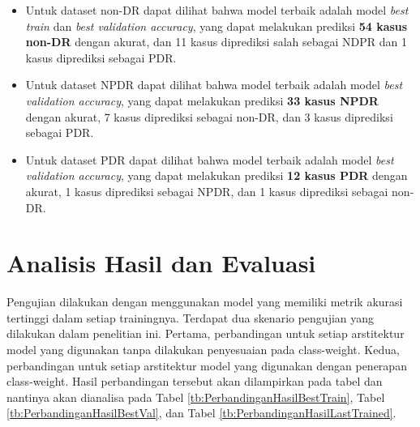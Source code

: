 \begin{itemize}
	\item Untuk dataset non-DR dapat dilihat bahwa model terbaik adalah model \emph{best train} dan \emph{best validation accuracy}, yang dapat melakukan prediksi \textbf{54 kasus non-DR} dengan akurat, dan 11 kasus diprediksi salah sebagai NDPR dan 1 kasus diprediksi sebagai PDR.
	
	\item Untuk dataset NPDR dapat dilihat bahwa model terbaik adalah model \emph{best validation accuracy}, yang dapat melakukan prediksi \textbf{33 kasus NPDR} dengan akurat, 7 kasus diprediksi sebagai non-DR, dan 3 kasus diprediksi sebagai PDR.
	
	\item Untuk dataset PDR dapat dilihat bahwa model terbaik adalah model \emph{best validation accuracy}, yang dapat melakukan prediksi \textbf{12 kasus PDR} dengan akurat, 1 kasus diprediksi sebagai NPDR, dan 1 kasus diprediksi sebagai non-DR.
\end{itemize}

\section{Analisis Hasil dan Evaluasi}
\label{sec:42}

Pengujian dilakukan dengan menggunakan model yang memiliki metrik akurasi tertinggi dalam setiap trainingnya. Terdapat dua skenario pengujian yang dilakukan dalam penelitian ini. Pertama, perbandingan untuk setiap arstitektur model yang digunakan tanpa dilakukan penyesuaian pada class-weight. Kedua, perbandingan untuk setiap arstitektur model yang digunakan dengan penerapan class-weight. Hasil perbandingan tersebut akan dilampirkan pada tabel dan nantinya akan dianalisa pada Tabel \ref{tb:PerbandinganHasilBestTrain}, Tabel \ref{tb:PerbandinganHasilBestVal}, dan Tabel \ref{tb:PerbandinganHasilLastTrained}.

